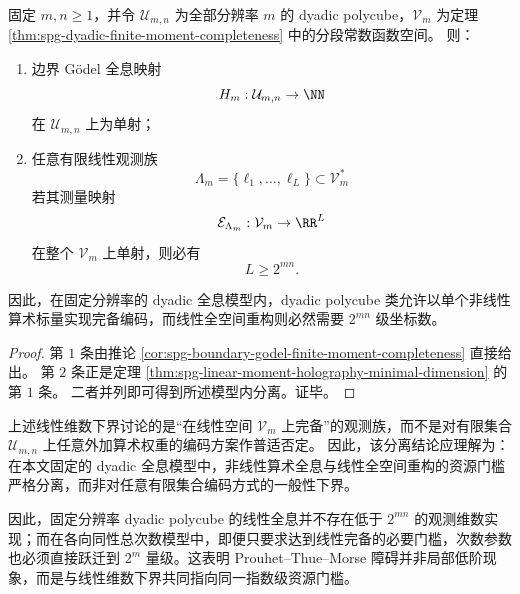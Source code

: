 \begin{theorem}[单整数非线性全息与线性矩全息的模型内维数分离]\label{thm:spg-single-integer-vs-linear-moment-holography-gap}
固定 \(m,n\ge 1\)，并令 \(\mathcal U_{m,n}\) 为全部分辨率 \(m\) 的 dyadic polycube，\(\mathcal V_m\) 为定理 \ref{thm:spg-dyadic-finite-moment-completeness} 中的分段常数函数空间。
则：
\begin{enumerate}
  \item 边界 Gödel 全息映射
        \[
        H_m:\mathcal U_{m,n}\to \NN
        \]
        在 \(\mathcal U_{m,n}\) 上为单射；
  \item 任意有限线性观测族
        \[
        \Lambda_m=\{\ell_1,\dots,\ell_L\}\subset \mathcal V_m^\ast
        \]
        若其测量映射
        \[
        \mathcal E_{\Lambda_m}:\mathcal V_m\to\RR^L
        \]
        在整个 \(\mathcal V_m\) 上单射，则必有
        \[
        L\ge 2^{mn}.
        \]
\end{enumerate}
因此，在固定分辨率的 dyadic 全息模型内，dyadic polycube 类允许以单个非线性算术标量实现完备编码，而线性全空间重构则必然需要 \(2^{mn}\) 级坐标数。
\end{theorem}
\begin{proof}
第 \(1\) 条由推论 \ref{cor:spg-boundary-godel-finite-moment-completeness} 直接给出。
第 \(2\) 条正是定理 \ref{thm:spg-linear-moment-holography-minimal-dimension} 的第 \(1\) 条。
二者并列即可得到所述模型内分离。证毕。
\end{proof}

\begin{remark}[线性维数下界的适用域]\label{rem:spg-single-integer-vs-linear-moment-holography-gap-scope}
上述线性维数下界讨论的是“在线性空间 \(\mathcal V_m\) 上完备”的观测族，而不是对有限集合 \(\mathcal U_{m,n}\) 上任意外加算术权重的编码方案作普适否定。
因此，该分离结论应理解为：在本文固定的 dyadic 全息模型中，非线性算术全息与线性全空间重构的资源门槛严格分离，而非对任意有限集合编码方式的一般性下界。
\end{remark}

\noindent
因此，固定分辨率 dyadic polycube 的线性全息并不存在低于 \(2^{mn}\) 的观测维数实现；而在各向同性总次数模型中，即便只要求达到线性完备的必要门槛，次数参数也必须直接跃迁到 \(2^m\) 量级。这表明 Prouhet--Thue--Morse 障碍并非局部低阶现象，而是与线性维数下界共同指向同一指数级资源门槛。

